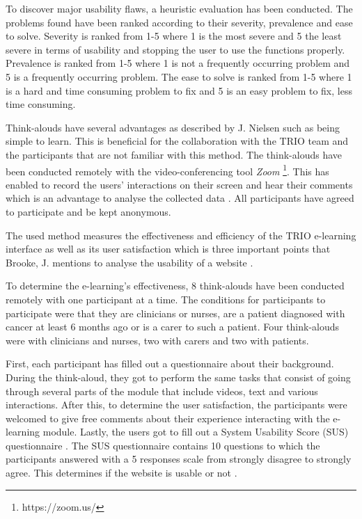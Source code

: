 \documentclass{sigchi}
\begin{document}
To discover major usability flaws, a heuristic evaluation has been conducted. The problems found have been ranked according to their severity, prevalence and ease to solve. Severity is ranked from 1-5 where 1 is the most severe and 5 the least severe in terms of usability and stopping the user to use the functions properly. Prevalence is ranked from 1-5 where 1 is not a frequently occurring problem and 5 is a frequently occurring problem. The ease to solve is ranked from 1-5 where 1 is a hard and time consuming problem to fix and 5 is an easy problem to fix, less time consuming. 

Think-alouds have several advantages as described by J. Nielsen \cite{nielsen2012thinking} such as being simple to learn. This is beneficial for the collaboration with the TRIO team and the participants that are not familiar with this method. The think-alouds have been conducted remotely with the video-conferencing tool \textit{Zoom} \footnote{https://zoom.us/}. This has enabled to record the users' interactions on their screen and hear their comments which is an advantage to analyse the collected data \cite{hammontree1994remote}. All participants have agreed to participate and be kept anonymous.

The used method measures the effectiveness and efficiency of the TRIO e-learning interface as well as its user satisfaction which is three important points that Brooke, J. mentions to analyse the usability of a website \cite{brooke1996sus}.

To determine the e-learning's effectiveness, 8 think-alouds have been conducted remotely with one participant at a time. The conditions for participants to participate were that they are clinicians or nurses, are a patient diagnosed with cancer at least 6 months ago or is a carer to such a patient. Four think-alouds were with clinicians and nurses, two with carers and two with patients.

First, each participant has filled out a questionnaire about their background. During the think-aloud, they got to perform the same tasks that consist of going through several parts of the module that include videos, text and various interactions. After this, to determine the user satisfaction, the participants were welcomed to give free comments about their experience interacting with the e-learning module. Lastly, the users got to fill out a System Usability Score (SUS) questionnaire \cite{brooke1996sus}. The SUS questionnaire contains 10 questions to which the participants answered with a 5 responses scale from strongly disagree to strongly agree. This determines if the website is usable or not \cite{brooke1996sus}.
\end{document}
